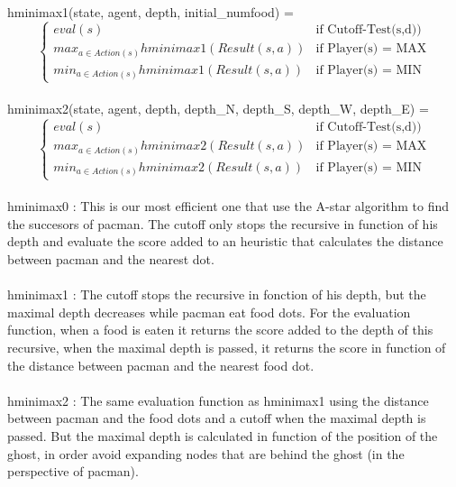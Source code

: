 \documentclass{article}
\begin{document}
\begin{enumerate}[label=\alph*.,leftmargin=*]
\begin{equation}
  \end{equation}
    \\
    hminimax1(state, agent, depth, initial\_numfood) =
    \\
    \begin{equation}
    \begin{cases}
      eval(s) & \text{if Cutoff-Test(s,d)}) \\
      max_{a \in Action(s)}hminimax1(Result(s,a)) & \text{if Player(s) = MAX}\\
      min_{a \in Action(s)}hminimax1(Result(s,a)) & \text{if Player(s) = MIN}
    \end{cases}
  \end{equation}
\\
hminimax2(state, agent, depth, depth\_N, depth\_S, depth\_W, depth\_E) =
    \\
    \begin{equation}
    \begin{cases}
      eval(s) & \text{if Cutoff-Test(s,d)}) \\
      max_{a \in Action(s)}hminimax2(Result(s,a)) & \text{if Player(s) = MAX}\\
      min_{a \in Action(s)}hminimax2(Result(s,a)) & \text{if Player(s) = MIN}
    \end{cases}
  \end{equation}
\\
hminimax0 : This is our most efficient one that use the A-star algorithm to find the succesors of pacman. The cutoff only stops the recursive in function of his depth and evaluate the score added to an heuristic that calculates the distance between pacman and the nearest dot.
\\
\\
hminimax1 : The cutoff stops the recursive in fonction of his depth, but the maximal depth decreases while pacman eat food dots. For the evaluation function, when a food is eaten it returns the score added to the depth of this recursive, when the maximal depth is passed, it returns the score in function of the distance between pacman and the nearest food dot.
\\
\\
hminimax2 : The same evaluation function as hminimax1 using the distance between pacman and the food dots and a cutoff when the maximal depth is passed. But the maximal depth is calculated in function of the position of the ghost, in order avoid expanding nodes that are behind the ghost (in the perspective of pacman).

\end{enumerate}
\end{document}
